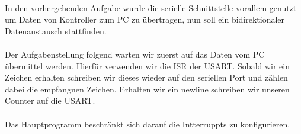 \paragraph*{}
In den vorhergehenden Aufgabe wurde die serielle Schnittstelle vorallem genutzt um Daten von Kontroller zum PC zu übertragen, nun soll ein bidirektionaler Datenaustausch stattfinden. \\

\paragraph*{}
Der Aufgabenstellung folgend warten wir zuerst auf das Daten vom PC übermittel werden. Hierfür verwenden wir die ISR der USART. Sobald wir ein Zeichen erhalten schreiben wir dieses wieder auf den seriellen Port und zählen dabei die empfangnen Zeichen. Erhalten wir ein newline schreiben wir unseren Counter auf die USART. \\



\paragraph*{}
Das Hauptprogramm beschränkt sich darauf die Intterruppts zu konfigurieren. \\





